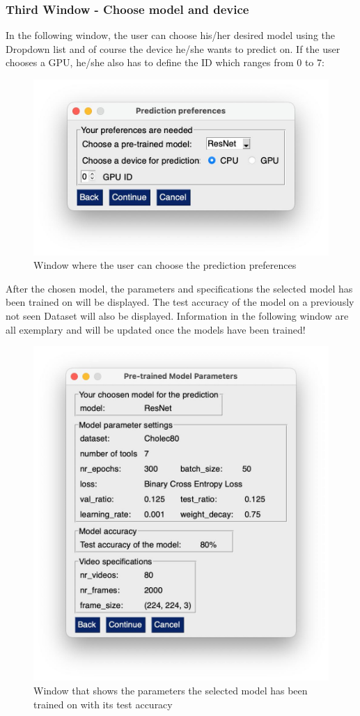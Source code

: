 \documentclass{article}
\begin{document}
\subsubsection{Third Window - Choose model and device}
In the following window, the user can choose his/her desired model using the Dropdown list and of course the device he/she wants to predict on. If the user chooses a GPU, he/she also has to define the ID which ranges from 0 to 7:

\begin{figure}[H]
    \centering
    \includegraphics[width = 0.7\linewidth]{Prediction_Preferences.jpg}
    \caption{Window where the user can choose the prediction preferences}
\end{figure}
\noindent
After the chosen model, the parameters and specifications the selected model has been trained on will be displayed. The test accuracy of the model on a previously not seen Dataset will also be displayed. Information in the following window are all exemplary and will be updated once the models have been trained!

\begin{figure}[H]
    \centering
    \includegraphics[width = 0.7\linewidth]{Parameter_window.jpg}
    \caption{Window that shows the parameters the selected model has been trained on with its test accuracy}
\end{figure}
\noindent
\end{document}
